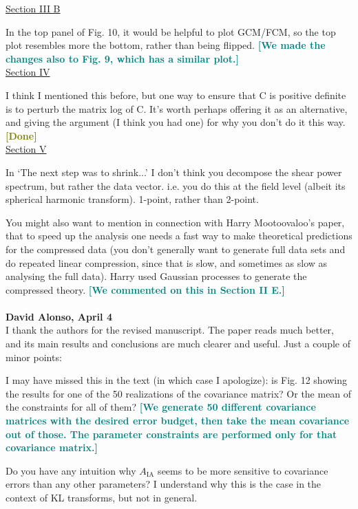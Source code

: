 \documentclass{article}
\newcommand\reply[1]{{\bf {\textcolor{teal}{[#1]}}}}
\newcommand\done{{\bf {\textcolor{olive}{[Done]}}}}
\begin{document}
    \underline{Section III B}
    
    In the top panel of Fig. 10, it would be helpful to plot GCM/FCM, so the top plot resembles more the bottom, rather than being flipped. \reply{We made the changes also to Fig. 9, which has a similar plot.}\\
    
    \underline{Section IV}
    
    I think I mentioned this before, but one way to ensure that C is positive definite is to perturb the matrix log of C.  It’s worth perhaps offering it as an alternative, and giving the argument (I think you had one) for why you don’t do it this way. \done \\
    
    \underline{Section V}
    
    In ‘The next step was to shrink...’ I don’t think you decompose the shear power spectrum, but rather the data vector.  i.e. you do this at the field level (albeit its spherical harmonic transform).  1-point, rather than 2-point.

    You might also want to mention in connection with Harry Mootoovaloo’s paper, that to speed up the analysis one needs a fast way to make theoretical predictions for the compressed data (you don’t generally want to generate full data sets and do repeated linear compression, since that is slow, and sometimes as slow as analysing the full data).  Harry used Gaussian processes to generate the compressed theory. \reply{We commented on this in Section II E.} \\  \\
	
	
	\textbf{David Alonso, April 4} \\

    I thank the authors for the revised manuscript. The paper reads much better, and its main results and conclusions are much clearer and useful. Just a couple of minor points:

    I may have missed this in the text (in which case I apologize): is Fig. 12 showing the results for one of the 50 realizations of the covariance matrix? Or the mean of the constraints for all of them? \reply{We generate 50 different covariance matrices with the desired error budget, then take the mean covariance out of those. The parameter constraints are performed only for that covariance matrix.}
    
    Do you have any intuition why $A_{\mathrm{IA}}$ seems to be more sensitive to covariance errors than any other parameters? I understand why this is the case in the context of KL transforms, but not in general.
    
\end{document}

